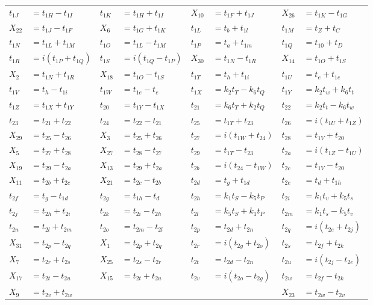 \begin{tabular}{|p{4.3pt}l|p{4.3pt}l|p{4.3pt}l|p{4.3pt}l|}
$t_{1J} $ &$= t_{1H} - t_{1I}$ & $t_{1K} $ &$= t_{1H} + t_{1I}$ & $X_{10} $ &$= t_{1F} + t_{1J}$ & $X_{26} $ &$= t_{1K} - t_{1G}$\\ 
$X_{22} $ &$= t_{1J} - t_{1F}$ & $X_6 $ &$= t_{1G} + t_{1K}$ & $t_{1L} $ &$= t_b + t_{1l}$ & $t_{1M} $ &$= t_Z + t_C$\\ 
$t_{1N} $ &$= t_{1L} + t_{1M}$ & $t_{1O} $ &$= t_{1L} - t_{1M}$ & $t_{1P} $ &$= t_a + t_{1m}$ & $t_{1Q} $ &$= t_{10} + t_D$\\ 
$t_{1R} $ &$= i(t_{1P} + t_{1Q})$ & $t_{1S} $ &$= i(t_{1Q} - t_{1P})$ & $X_{30} $ &$= t_{1N} - t_{1R}$ & $X_{14} $ &$= t_{1O} + t_{1S}$\\ 
$X_2 $ &$= t_{1N} + t_{1R}$ & $X_{18} $ &$= t_{1O} - t_{1S}$ & $t_{1T} $ &$= t_h + t_{1i}$ & $t_{1U} $ &$= t_e + t_{1e}$\\ 
$t_{1V} $ &$= t_h - t_{1i}$ & $t_{1W} $ &$= t_{1e} - t_e$ & $t_{1X} $ &$= k_2t_T - k_6t_Q$ & $t_{1Y} $ &$= k_2t_w + k_6t_t$\\ 
$t_{1Z} $ &$= t_{1X} + t_{1Y}$ & $t_{20} $ &$= t_{1Y} - t_{1X}$ & $t_{21} $ &$= k_6t_T + k_2t_Q$ & $t_{22} $ &$= k_2t_t - k_6t_w$\\ 
$t_{23} $ &$= t_{21} + t_{22}$ & $t_{24} $ &$= t_{22} - t_{21}$ & $t_{25} $ &$= t_{1T} + t_{23}$ & $t_{26} $ &$= i(t_{1U} + t_{1Z})$\\ 
$X_{29} $ &$= t_{25} - t_{26}$ & $X_3 $ &$= t_{25} + t_{26}$ & $t_{27} $ &$= i(t_{1W} + t_{24})$ & $t_{28} $ &$= t_{1V} + t_{20}$\\ 
$X_5 $ &$= t_{27} + t_{28}$ & $X_{27} $ &$= t_{28} - t_{27}$ & $t_{29} $ &$= t_{1T} - t_{23}$ & $t_{2a} $ &$= i(t_{1Z} - t_{1U})$\\ 
$X_{19} $ &$= t_{29} - t_{2a}$ & $X_{13} $ &$= t_{29} + t_{2a}$ & $t_{2b} $ &$= i(t_{24} - t_{1W})$ & $t_{2c} $ &$= t_{1V} - t_{20}$\\ 
$X_{11} $ &$= t_{2b} + t_{2c}$ & $X_{21} $ &$= t_{2c} - t_{2b}$ & $t_{2d} $ &$= t_g + t_{1d}$ & $t_{2e} $ &$= t_d + t_{1h}$\\ 
$t_{2f} $ &$= t_g - t_{1d}$ & $t_{2g} $ &$= t_{1h} - t_d$ & $t_{2h} $ &$= k_1t_S - k_5t_P$ & $t_{2i} $ &$= k_1t_v + k_5t_s$\\ 
$t_{2j} $ &$= t_{2h} + t_{2i}$ & $t_{2k} $ &$= t_{2i} - t_{2h}$ & $t_{2l} $ &$= k_5t_S + k_1t_P$ & $t_{2m} $ &$= k_1t_s - k_5t_v$\\ 
$t_{2n} $ &$= t_{2l} + t_{2m}$ & $t_{2o} $ &$= t_{2m} - t_{2l}$ & $t_{2p} $ &$= t_{2d} + t_{2n}$ & $t_{2q} $ &$= i(t_{2e} + t_{2j})$\\ 
$X_{31} $ &$= t_{2p} - t_{2q}$ & $X_1 $ &$= t_{2p} + t_{2q}$ & $t_{2r} $ &$= i(t_{2g} + t_{2o})$ & $t_{2s} $ &$= t_{2f} + t_{2k}$\\ 
$X_7 $ &$= t_{2r} + t_{2s}$ & $X_{25} $ &$= t_{2s} - t_{2r}$ & $t_{2t} $ &$= t_{2d} - t_{2n}$ & $t_{2u} $ &$= i(t_{2j} - t_{2e})$\\ 
$X_{17} $ &$= t_{2t} - t_{2u}$ & $X_{15} $ &$= t_{2t} + t_{2u}$ & $t_{2v} $ &$= i(t_{2o} - t_{2g})$ & $t_{2w} $ &$= t_{2f} - t_{2k}$\\ 
$X_9 $ &\multicolumn{5}{l|}{$= t_{2v} + t_{2w}$} & $X_{23} $ &$= t_{2w} - t_{2v}$\\ 
\bottomrule\end{tabular}

